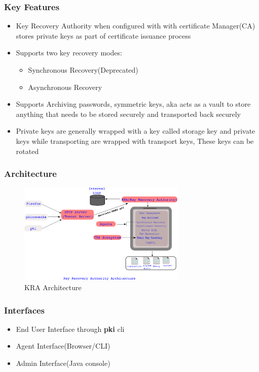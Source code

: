 \documentclass[a4paper]{article}
\begin{document}
\subsubsection{Key Features}
\begin{itemize}
    \item Key Recovery Authority when configured with with certificate Manager(CA) stores private keys as part of
        certificate issuance process
    \item Supports two key recovery modes:
        \begin{itemize}
            \item Synchronous Recovery(Deprecated)
            \item Asynchronous Recovery
        \end{itemize}
    \item Supports Archiving passwords, symmetric keys, aka acts as a vault to store anything that needs
        to be stored securely and transported back securely
    \item Private keys are generally wrapped with a key called storage key and private keys
        while transporting are wrapped with transport keys, These keys can be rotated
\end{itemize}
\subsubsection{Architecture}
\begin{figure}[H]
    \centering
    \includegraphics[width=80mm]{KRA-Architecture.png}
    \caption{KRA Architecture}
\end{figure}
\subsubsection{Interfaces}
\begin{itemize}
    \item End User Interface through \textbf{pki} cli
    \item Agent Interface(Browser/CLI)
    \item Admin Interface(Java console)
\end{itemize}
\end{document}
